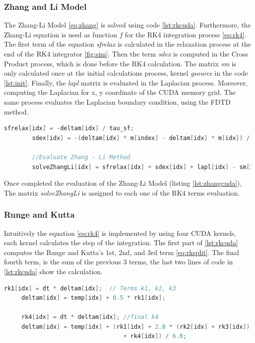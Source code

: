 \subsubsection{Zhang and Li Model}

The Zhang-Li Model \ref{eq:zhang} is solved using code \ref{lst:rkcuda}. Furthermore, the Zhang-Li equation is used as function $f$ for the RK4 integration process \ref{eq:rk4}. The first term of the equation \textit{sfrelax} is calculated in the relaxation process at the end of the RK4 integrator \ref{fig:sim}. Then the term \textit{sdex} is computed in the Cross Product process, which is done before the RK4 calculation. The matrix \textit{sm} is only calculated once at the initial calculations process, kernel \textit{gsource} in the code \ref{lst:init}. Finally, the \textit{lapl} matrix is evaluated in the Laplacian process. Moreover, computing the Laplacian for x, y coordinate of the CUDA memory grid. The same process evaluates the Laplacian boundary condition, using the FDTD method.

\begin{lstlisting}[language=C++, label={lst:zhangcuda}, caption={Runge and Kutta 4th Terms}]
		sfrelax[idx] = -deltam[idx] / tau_sf;
		sdex[idx] = -(deltam[idx] * m[index] - deltam[idx] * m[idx]) / tau_sd;
		
		//Evaluate Zhang - Li Method
        solveZhangLi[idx] = sfrelax[idx] + sdex[idx] + lapl[idx] - sm[idx];
\end{lstlisting}

Once completed the evaluation of the Zhang-Li Model (listing \ref{lst:zhangcuda}), The matrix \textit{solveZhangLi} is assigned to each one of the RK4 terms evaluation.

\subsubsection{Runge and Kutta}
 
Intuitively the equation \ref{eq:rk4} is implemented by using four CUDA kernels, each kernel calculates the step of the integration. The first part of \ref{lst:rkcuda} computes the Runge and Kutta's 1st, 2nd, and 3rd  term \ref{eq:rksplit}. The final fourth term, is the sum of the previous 3 terms, the last two lines of code in \ref{lst:rkcuda} show the calculation.

\begin{lstlisting}[language=C++, label={lst:rkcuda}, caption={Runge and Kutta 4th Terms}]
     rk1[idx] = dt * deltam[idx];  // Terms k1, k2, k3
     deltam[idx] = temp[idx] + 0.5 * rk1[idx];
     
     rk4[idx] = dt * deltam[idx]; //final k4
     deltam[idx] = temp[idx] + (rk1[idx] + 2.0 * (rk2[idx] + rk3[idx])
                                  + rk4[idx]) / 6.0;
\end{lstlisting}

